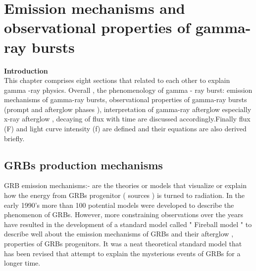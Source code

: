 \setcounter{chapter}{1}
\chapter{ Emission mechanisms and observational properties of gamma-ray bursts}
\label{chap:2}
\textbf{Introduction}\\
This chapter  comprises eight sections that related to  each other to  explain  gamma -ray physics. Overall , the  phenomenology of gamma - ray burst: emission mechanisms of gamma-ray bursts, observational properties of gamma-ray bursts (prompt and afterglow phases ), interpretation  of gamma-ray afterglow especially x-ray afterglow , decaying of flux with time are discussed accordingly.Finally flux (F) and light curve intensity (f) are defined and their equations are also derived briefly.    
\section{GRBs production mechanisms}
GRB emission mechanisms:- are the theories or models that visualize or  explain  how the  energy from GRBs  progenitor ( sources ) is turned to radiation. In the early 1990’s   more than 100  potential  models  were  developed to describe the phenomenon of GRBs. However, more  constraining  observations  over  the  years have resulted in the  development of a standard  model called  " Fireball model " to describe  well about the  emission  mechanisms of GRBs and their afterglow , properties of GRBs progenitors. It was a neat theoretical standard model that has been revised that   attempt to explain  the mysterious events of GRBs for a longer time.\citep {13}\\\\    
